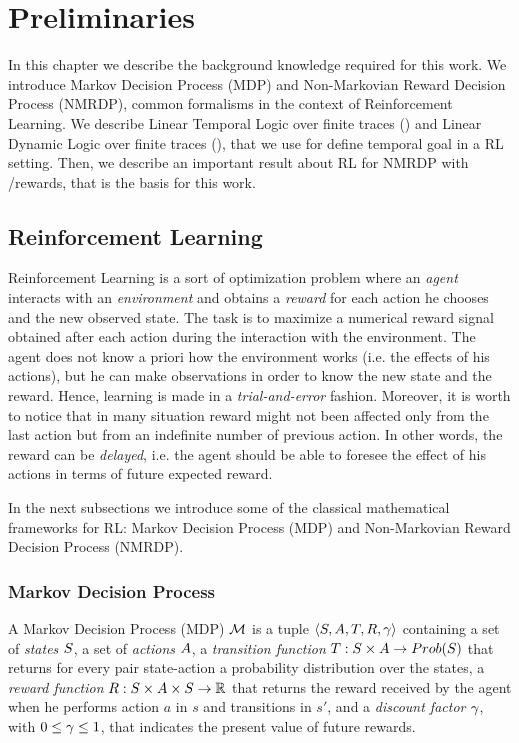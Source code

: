\chapter{Preliminaries}
\label{preliminaries}
In this chapter we describe the background knowledge required for this work. We introduce Markov Decision Process (MDP) and Non-Markovian Reward Decision Process (NMRDP), common formalisms in the context of Reinforcement Learning. We describe Linear Temporal Logic over finite traces (\LTLf) and Linear Dynamic Logic over finite traces (\LDLf), that we use for define temporal goal in a RL setting. Then, we describe an important result about RL for NMRDP with \LTLf/\LDLf rewards, that is the basis for this work.

\section{Reinforcement Learning}
\label{RL}
Reinforcement Learning \citep{Sutton:1998:IRL:551283} is a sort of optimization problem where an \emph{agent} interacts with an \emph{environment} and obtains a \emph{reward} for each action he chooses and the new observed state. The task is to maximize a numerical reward signal obtained after each action during the interaction with the environment. The agent does not know a priori how the environment works (i.e. the effects of his actions), but he can make observations in order to know the new state and the reward. Hence, learning is made in a \emph{trial-and-error} fashion. Moreover, it is worth to notice that in many situation reward might not been affected only from the last action but from an indefinite number of previous action. In other words, the reward can be \emph{delayed}, i.e. the agent should be able to foresee the effect of his actions in terms of future expected reward. 

In the next subsections we introduce some of the classical mathematical frameworks for RL: Markov Decision Process (MDP) and Non-Markovian Reward Decision Process (NMRDP).
\subsection{Markov Decision Process}
\label{MDP}

	A Markov Decision Process (MDP) $\mathcal{M}$ is a tuple $\langle S, A, T, R, \gamma \rangle$ containing a set of \emph{states} $S$, a set of \emph{actions} $A$, a \emph{transition function} $T: S \times A \to Prob(S)$ that returns for every pair state-action a probability distribution over the states, a \emph{reward function} $R: S \times A \times S \to \mathbb{R}$ that returns the reward received by the agent when he performs action $a$ in $s$ and transitions in $s'$, and a \emph{discount factor} $\gamma$, with $0 \le \gamma \le 1$, that indicates the present value of future rewards.
	
